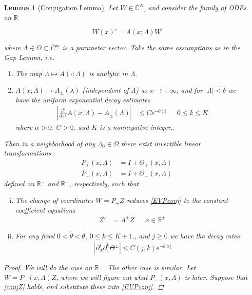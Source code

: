 \documentclass[12pt]{article}
\def\R{{\mathbb R}}
\def\C{{\mathbb C}}
\newtheorem{lemma}{Lemma}
\begin{document}
\begin{lemma}[Conjugation Lemma]
Let $W \in \C^N$, and consider the family of ODEs on $\R$

\begin{equation}\label{EVPconj}
W(x)' = A(x; \Lambda) W
\end{equation}

where $\Lambda \in \Omega \subset C^m$ is a parameter vector. Take the same assumptions as in the Gap Lemma, i.e. 

\begin{enumerate}
	\item The map $\Lambda \mapsto A(\cdot; \Lambda)$ is analytic in $\Lambda$.
	\item $A(x; \Lambda) \rightarrow A_\pm(\lambda)$ (independent of $\Lambda$) as $x \rightarrow \pm \infty$, and for $|\Lambda| < \delta$ we have the uniform exponential decay estimates 
	\begin{align}
	\left| \frac{\partial^k}{\partial x^k} A(x; \Lambda) - A_\pm(\Lambda) \right| 
	&\leq C e^{-\theta |x|} && 0 \leq k \leq K
	\end{align}
	where $\alpha > 0$, $C > 0$, and $K$ is a nonnegative integer,.
\end{enumerate}

Then in a neighborhood of any $\Lambda_0 \in \Omega$ there exist invertible linear transformations
\begin{align*}
P_+(x, \Lambda) &= I + \Theta_+(x, \Lambda) \\
P_-(x, \Lambda) &= I + \Theta_-(x, \Lambda) 
\end{align*}
defined on $\R^+$ and $\R^-$, respectively, such that
\begin{enumerate}[(i)]
\item The change of coordinates $W = P_\pm Z$ reduces \eqref{EVPconj} to the constant-coefficient equations
\begin{align}\label{conjZ}
Z' &= A^\pm Z && x \in \R^\pm
\end{align}
\item For any fixed $0 < \tilde{\theta} < \theta$, $0 \leq k \leq K+1$., and $j \geq 0$ we have the decay rates
\begin{align*}
\left| \partial_\Lambda^j \partial_x^k \Theta^\pm \right| \leq C(j, k)e^{-\tilde{\theta}|x|}
\end{align*}
\end{enumerate}
\begin{proof}
We will do the case on $\R^-$. The other case is similar. 
Let $W = P_-(x, \Lambda) Z$, where we will figure out what $P_-(x, \Lambda)$ is later. Suppose that \eqref{conjZ} holds, and substitute these into \eqref{EVPconj}.


\end{proof}
\end{lemma}
\end{document}

